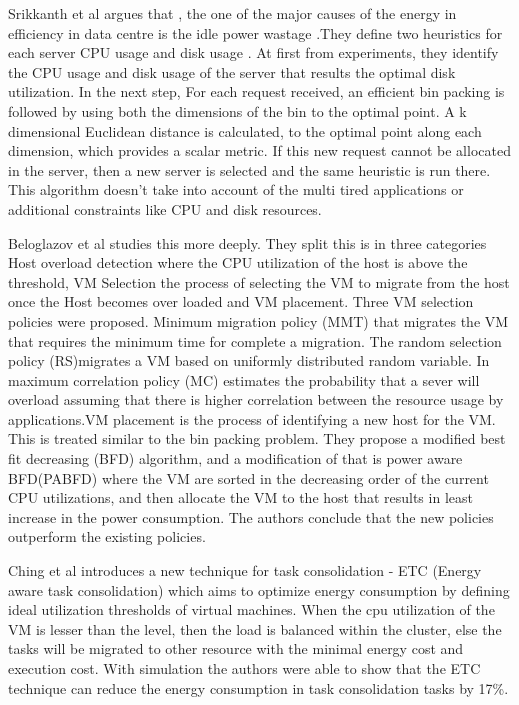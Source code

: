 \documentclass[a4paper,12pt]{Classes/RoboticsLaTeX}
\begin{document}
    Srikkanth et al \cite{srikantaiah2008energy}argues that , the one of the major  causes of the energy in efficiency in data centre is the idle power wastage .They define two heuristics  for each server CPU usage and disk usage . At first from experiments, they identify the CPU usage and disk usage of the server that results the optimal disk utilization. In the next step, For each request received, an efficient bin packing is followed by using both the dimensions of the bin to the optimal point. A k dimensional Euclidean distance is calculated, to the optimal point along each dimension, which provides a scalar metric.  If this new request cannot be allocated in the server, then a new server is selected and the same heuristic is run there. This algorithm doesn't take into account of the multi tired applications or additional constraints like CPU and disk resources.
    
    Beloglazov et al \cite{beloglazov2012optimal} studies this more deeply. They split this is in three categories Host overload detection where the CPU utilization of the host is above the threshold, VM Selection the process of selecting the VM to migrate from the host once the Host becomes over loaded and VM placement. Three VM selection policies were proposed. Minimum migration policy (MMT) that migrates the VM that requires the minimum time for complete a migration. The random selection policy (RS)migrates a VM based on uniformly distributed random variable. In maximum correlation policy (MC) estimates the probability that a sever will overload assuming that there is higher correlation between the resource usage by applications.VM placement is the process of identifying a new host for the VM. This is treated similar to the bin packing problem. They propose a modified best fit decreasing (BFD) algorithm, and a modification of that is power aware BFD(PABFD) where the VM are sorted in the decreasing order of the current CPU utilizations, and then allocate the VM to the host that results in least increase in the power consumption. The authors conclude that the new policies outperform the existing policies.
    
    Ching et al \cite{hsu2011energy}introduces a new technique for task consolidation - ETC (Energy aware task consolidation) which aims to optimize energy consumption by defining ideal utilization thresholds of virtual machines. When the cpu utilization of the VM is lesser than the level, then the load is balanced within the cluster, else the tasks will be migrated to other resource with the minimal energy cost and execution cost. With simulation the authors were able to show that the ETC technique can reduce the energy consumption in task consolidation tasks by 17\%.
    
\end{document}

